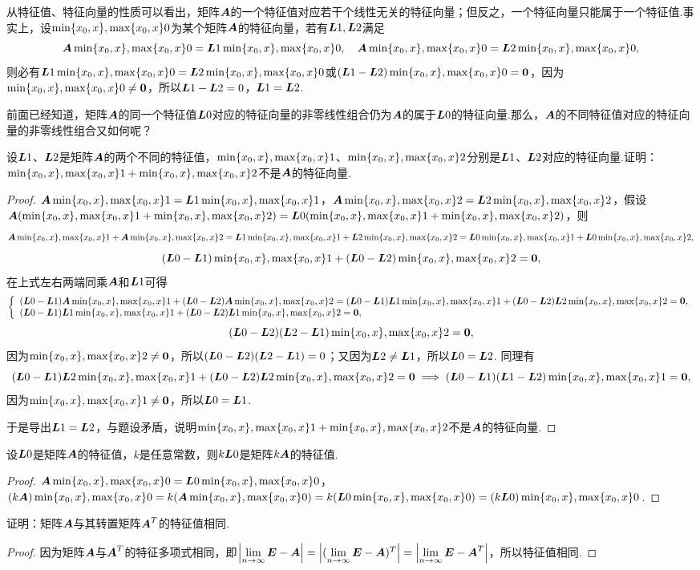 从特征值、特征向量的性质可以看出，矩阵\(\A\)的一个特征值对应若干个线性无关的特征向量；但反之，一个特征向量只能属于一个特征值.事实上，设\(\X0\)为某个矩阵\(\A\)的特征向量，若有\(\L{1},\L{2}\)满足\[
\A\X0=\L{1}\X0,
\quad
\A\X0=\L{2}\X0,
\]则必有\(\L{1}\X0=\L{2}\X0\)或\((\L{1}-\L{2})\X0=\z\)，因为\(\X0\neq\z\)，所以\(\L{1}-\L{2}=0\)，\(\L{1}=\L{2}\).

前面已经知道，矩阵\(\A\)的同一个特征值\(\L0\)对应的特征向量的非零线性组合仍为\(\A\)的属于\(\L0\)的特征向量.那么，\(\A\)的不同特征值对应的特征向量的非零线性组合又如何呢？
\begin{example}
设\(\L{1}\)、\(\L{2}\)是矩阵\(\A\)的两个不同的特征值，\(\X1\)、\(\X2\)分别是\(\L{1}\)、\(\L{2}\)对应的特征向量.证明：\(\X1+\X2\)不是\(\A\)的特征向量.
\begin{proof}
\(\A\X1 = \L{1}\X1\)，\(\A\X2 = \L{2}\X2\)，假设\(\A(\X1+\X2) = \L0(\X1+\X2)\)，则\[
\A\X1+\A\X2 =\L{1}\X1+\L{2}\X2 = \L0\X1+\L0\X2,
\]\[
(\L0-\L{1})\X1+(\L0-\L{2})\X2 = \z,
\]在上式左右两端同乘\(\A\)和\(\L{1}\)可得\[
\left\{ \begin{array}{l}
(\L0-\L{1})\A\X1+(\L0-\L{2})\A\X2 = (\L0-\L{1})\L{1}\X1 + (\L0-\L{2})\L{2}\X2 = \z, \\
(\L0-\L{1})\L{1}\X1+(\L0-\L{2})\L{1}\X2 = \z,
\end{array} \right.
\]\[
(\L0-\L{2})(\L{2}-\L{1})\X2 = \z,
\]因为\(\X2\neq\z\)，所以\((\L0-\L{2})(\L{2}-\L{1})=0\)；又因为\(\L{2}\neq\L{1}\)，所以\(\L0=\L{2}\).
同理有\[
(\L0-\L{1})\L{2}\X1+(\L0-\L{2})\L{2}\X2 = \z
\implies
(\L0-\L{1})(\L{1}-\L{2})\X1 = \z,
\]因为\(\X1\neq\z\)，所以\(\L0=\L{1}\).

于是导出\(\L{1}=\L{2}\)，与题设矛盾，说明\(\X1+\X2\)不是\(\A\)的特征向量.
\end{proof}
\end{example}

\begin{example}
设\(\L0\)是矩阵\(\A\)的特征值，\(k\)是任意常数，则\(k\L0\)是矩阵\(k\A\)的特征值.
\begin{proof}
\(\A\X0=\L0\X0\)，\((k\A)\X0=k(\A\X0)=k(\L0\X0)=(k\L0)\X0\).
\end{proof}
\end{example}

\begin{example}
证明：矩阵\(\A\)与其转置矩阵\(\A^T\)的特征值相同.
\begin{proof}
因为矩阵\(\A\)与\(\A^T\)的特征多项式相同，即\(\abs{\l\E-\A} = \abs{(\l\E-\A)^T} = \abs{\l\E-\A^T}\)，所以特征值相同.
\end{proof}
\end{example}

